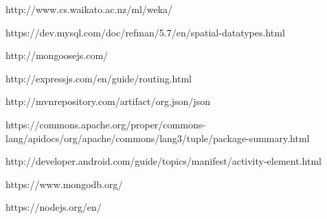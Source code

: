 \documentclass[12pt]{informatics-report}
\begin{document}
\begin{thebibliography}{99}
 http://www.cs.waikato.ac.nz/ml/weka/

 https://dev.mysql.com/doc/refman/5.7/en/spatial-datatypes.html

 http://mongoosejs.com/

 http://expressjs.com/en/guide/routing.html

 http://mvnrepository.com/artifact/org.json/json

 https://commons.apache.org/proper/commons-lang/apidocs/org/apache/commons/lang3/tuple/package-summary.html

 http://developer.android.com/guide/topics/manifest/activity-element.html

 https://www.mongodb.org/

 https://nodejs.org/en/

\end{thebibliography}
\appendix



\end{document}
